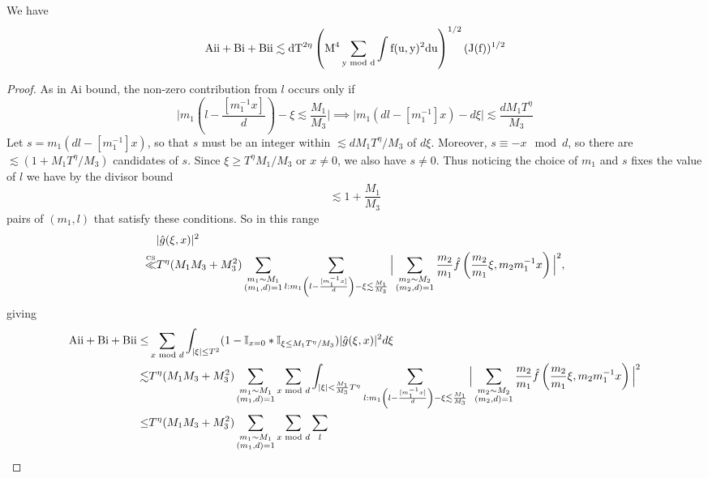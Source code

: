 \begin{lemma}\label{affineweirdterm}
    We have
    \[
    \rm{Aii}+\rm{Bi}+\rm{Bii}\lesssim dT^{2\eta}\left(M^4 \sum_{y\mod d}\int f(u,y)^2 du\right)^{1/2} (J(f))^{1/2}
    \]
\end{lemma}
\begin{proof}
    As in Ai bound, the non-zero contribution from $l$ occurs only if \[
        \Bigg|m_1\left(l-\frac{[m_1^{-1}x]}{d}\right)- \xi \lesssim \frac{M_1}{M_3} \Bigg|\implies
        \Bigg|m_1\left(dl-[m_1^{-1}]x\right) -d\xi\Bigg|\lesssim\frac{dM_1T^\eta}{M_3}
    \]
    Let $s=m_1\left(dl-[m_1^{-1}]x\right) $, so that $s$ must be an integer within $\lesssim{dM_1T^\eta}/{M_3}$ of $d\xi$. Moreover, $s\equiv -x \mod d$, so there are $\lesssim (1+M_1T^\eta/M_3)$ candidates of $s$. Since $\xi\geq T^\eta M_1/M_3$ or $x\neq 0$, we also have $s\neq 0$. Thus noticing the choice of $m_1$ and $s$ fixes the value of $l$ we have by the divisor bound \[
    \lesssim 1+\frac{M_1}{M_3}
    \]
    pairs of $(m_1,l)$ that satisfy these conditions. So in this range 
    \begin{align*}
        &|\hat{g}(\xi,x)|^2 \\
        \stackon{CS}{\ll}&T^\eta(M_1M_3+M_3^2)
        \sum_{\substack{m_1\sim M_1\\(m_1,d)=1}}  \sum_{l : m_1\left(l-\frac{[m_1^{-1}x]}{d}\right)- \xi \lesssim \frac{M_1}{M_3} } 
        \Big|
            \sum_{\substack{m_2\sim M_2\\(m_2,d)=1}} \frac{m_2}{m_1}\hat{f}\left(\frac{m_2}{m_1}\xi, m_2m_1^{-1}x\right) 
            \Big|^2,\\
    \end{align*}
    giving 
    \begin{align*}
        \rm{Aii}+{Bi}+{Bii}\leq&\sum_{x \mod d}\int_{|\xi|\leq T^2} (1-\mathbb{I}_{x=0}*\mathbb{I}_{\xi\leq M_1T^{\eta}/M_3})|\hat{g}(\xi,x)|^2 d\xi\\
        {\lesssim}&T^\eta(M_1M_3+M_3^2)
        \sum_{\substack{m_1\sim M_1\\(m_1,d)=1}} \sum_{x \mod d} \int_{|\xi|<\frac{M_1}{M_3}T^\eta}\sum_{l : m_1\left(l-\frac{[m_1^{-1}x]}{d}\right)- \xi \lesssim \frac{M_1}{M_3} } 
        \Big|
            \sum_{\substack{m_2\sim M_2\\(m_2,d)=1}} \frac{m_2}{m_1}\hat{f}\left(\frac{m_2}{m_1}\xi, m_2m_1^{-1}x\right) 
            \Big|^2\\
            \leq&T^\eta(M_1M_3+M_3^2)
            \sum_{\substack{m_1\sim M_1\\(m_1,d)=1}} \sum_{x \mod d} \sum_{l} 

\end{align*}
\end{proof}

